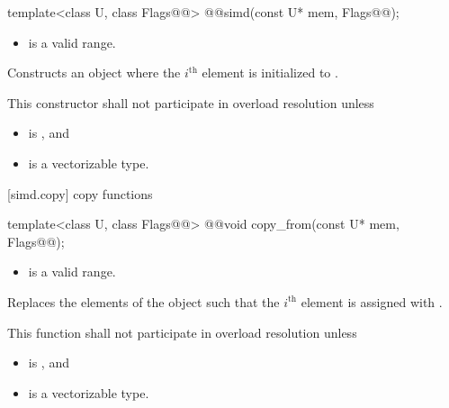 \begin{itemdecl}
template<class U, class Flags@@> @@simd(const U* mem, Flags@\wgAdd{ = \{\}}@);
\end{itemdecl}

\begin{itemdescr}
  \pnum\requires
  \begin{itemize}
    \item \tcode{[mem, mem + size())} is a valid range.
  \end{itemize}

  \pnum\effects
  Constructs an object where the $i^\text{th}$ element is initialized to  \foralli.

  \pnum\remarks
  This constructor shall not participate in overload resolution unless
  \begin{itemize}
    \item {} is , and
    \item {} is a vectorizable type.
  \end{itemize}
\end{itemdescr}

[simd.copy]{ copy functions}

\begin{itemdecl}
template<class U, class Flags@@> @@void copy_from(const U* mem, Flags@\wgAdd{ = \{\}}@);
\end{itemdecl}

\begin{itemdescr}
  \pnum\requires
  \begin{itemize}
    \item \tcode{[mem, mem + size())} is a valid range.
  \end{itemize}

  \pnum\effects
  Replaces the elements of the  object such that the $i^\text{th}$ element is assigned with  \foralli.

  \pnum\remarks
  This function shall not participate in overload resolution unless
  \begin{itemize}
    \item {} is , and
    \item {} is a vectorizable type.
  \end{itemize}
\end{itemdescr}


